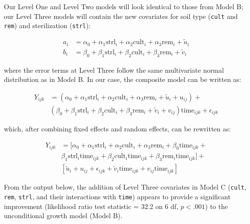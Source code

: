 \documentclass[
]{krantz}
\begin{document}
Our Level One and Level Two models will look identical to those from Model B; our Level Three models will contain the new covariates for soil type (\texttt{cult} and \texttt{rem}) and sterilization (\texttt{strl}):

\begin{align*}
a_{i} & = \alpha_{0}+\alpha_{1}\textrm{strl}_{i}+\alpha_{2}\textrm{cult}_{i}+\alpha_{3}\textrm{rem}_{i}+\tilde{u}_{i} \\
b_{i} & = \beta_{0}+\beta_{1}\textrm{strl}_{i}+\beta_{2}\textrm{cult}_{i}+\beta_{3}\textrm{rem}_{i}+\tilde{v}_{i}
\end{align*}

where the error terms at Level Three follow the same multivariate normal distribution as in Model B. In our case, the composite model can be written as:

\begin{align*}
Y_{ijk} & = (\alpha_{0}+\alpha_{1}\textrm{strl}_{i}+\alpha_{2}\textrm{cult}_{i}+\alpha_{3}\textrm{rem}_{i}+\tilde{u}_{i}+u_{ij}) + \\
 & (\beta_{0}+\beta_{1}\textrm{strl}_{i}+\beta_{2}\textrm{cult}_{i}+\beta_{3}\textrm{rem}_{i}+\tilde{v}_{i}+
 v_{ij})\textrm{time}_{ijk}+\epsilon_{ijk} 
\end{align*}

which, after combining fixed effects and random effects, can be rewritten as:

\begin{align*}
Y_{ijk} & = [\alpha_{0}+\alpha_{1}\textrm{strl}_{i}+\alpha_{2}\textrm{cult}_{i}+\alpha_{3}\textrm{rem}_{i} +
 \beta_{0}\textrm{time}_{ijk} + \\
 & \beta_{1}\textrm{strl}_{i}\textrm{time}_{ijk}+\beta_{2}\textrm{cult}_{i}\textrm{time}_{ijk}+ \beta_{3}\textrm{rem}_{i}\textrm{time}_{ijk}] + \\
 & [\tilde{u}_{i}+u_{ij}+\epsilon_{ijk}+\tilde{v}_{i}\textrm{time}_{ijk}+v_{ij}\textrm{time}_{ijk}]
\end{align*}

From the output below, the addition of Level Three covariates in Model C (\texttt{cult}, \texttt{rem}, \texttt{strl}, and their interactions with \texttt{time}) appears to provide a significant improvement (likelihood ratio test statistic = 32.2 on 6 df, \(p<.001\)) to the unconditional growth model (Model B).
\end{document}
